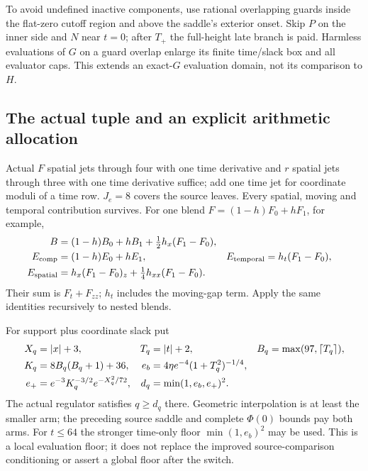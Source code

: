 To avoid undefined inactive components, use rational overlapping guards
inside the flat-zero cutoff region and above the saddle's exterior
onset. Skip $P$ on the inner side and $N$ near $t=0$; after $T_+$
the full-height late branch is paid. Harmless evaluations of $G$ on a
guard overlap enlarge its finite time/slack box and all evaluator caps.
This extends an exact-$G$ evaluation domain, not its comparison to $H$.

\subsection{The actual tuple and an explicit arithmetic allocation}
Actual $F$ spatial jets through four with one time derivative and $r$
spatial jets through three with one time derivative suffice; add one
time jet for coordinate moduli of a time row. $J_e=8$ covers the
source leaves. Every spatial, moving and temporal contribution survives.
For one blend $F=(1-h)F_0+hF_1$, for example,
\begin{align}
 B&=(1-h)B_0+hB_1+\tfrac12h_x(F_1-F_0),\notag\\
 E_{\rm comp}&=(1-h)E_0+hE_1,&
 E_{\rm temporal}&=h_t(F_1-F_0),\notag\\
 E_{\rm spatial}&=h_x(F_1-F_0)_z+\tfrac14h_{xx}(F_1-F_0).
 \label{eq:ev-defects}
\end{align}
Their sum is $F_t+F_{zz}$; $h_t$ includes the moving-gap term.
Apply the same identities recursively to nested blends.

For support plus coordinate slack put
\begin{align}
 X_q&=|x|+3,&T_q&=|t|+2,&B_q&=\max(97,\lceil T_q\rceil),\notag\\
 K_q&=8B_q(B_q+1)+36,&
 e_b&=4\eta e^{-4}(1+T_q^2)^{-1/4},\notag\\
 e_+&=e^{-3}K_q^{-3/2}e^{-X_q^2/72},&
 d_q&=\min(1,e_b,e_+)^2.
 \label{eq:ev-local-floor}
\end{align}
The actual regulator satisfies $q\ge d_q$ there. Geometric
interpolation is at least the smaller arm; the preceding source saddle
and complete $\Phi(0)$ bounds pay both arms. For $t\le64$ the
stronger time-only floor $\min(1,e_b)^2$ may be used. This is a local
evaluation floor; it does not replace the improved source-comparison
conditioning or assert a global floor after the switch.

